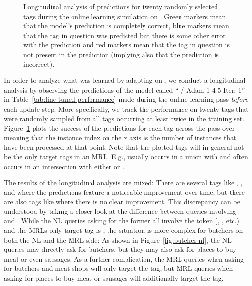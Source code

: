 \begin{figure}[h]
  \centering
  \resizebox{\textwidth}{!}{}
  \caption[Longitudinal analysis]{Longitudinal analysis of predictions for
    twenty randomly selected tags during the online learning simulation on
    \nlmfour{}. \textcolor{mplGreen}{Green markers} mean that the model’s
    prediction is completely correct, \textcolor{mplBlue}{blue markers} mean
    that the tag in question was predicted but there is some other error with
    the prediction and \textcolor{mplRed}{red markers} mean that the tag in
    question is not present in the prediction (implying also that the prediction
    is incorrect).}
  \label{fig:online-analysis}
\end{figure}

In order to analyze what was learned by adapting on \nlmfour{}, we conduct a
longitudinal analysis by observing the predictions of the model called
\enquote{\nlmthree{} \textrightarrow{} \nlmthree{}/\nlmfour{} Adam 1-4-5 Iter:
  1} in Table~\ref{tab:fine-tuned-performance} made during the online learning
pass \emph{before} each update step. More specifically, we track the performance
on twenty tags that were randomly sampled from all tags occurring at least twice
in the \nlmfour{} training set. Figure~\ref{fig:online-analysis} plots the
success of the predictions for each tag across the pass over \nlmfour{} meaning
that the instance index on the x axis is the number of instances that have been
processed at that point. Note that the plotted tags will in general not be the
only target tags in an MRL. E.g.,  usually occurs
in a union with  and  often occurs
in an intersection with either  or
.

The results of the longitudinal analysis are mixed: There are several tags like
, ,  and
 where the predictions feature a noticeable improvement
over time, but there are also tags like  where there is no
clear improvement. This discrepancy can be understood by taking a closer look at
the difference between queries involving  and .
While the NL queries asking for the former all involve the token 
(, , etc.) and the MRLs only
target tag is , the situation is more complex for butchers
on both the NL and the MRL side: As shown in Figure~\ref{fig:butcher-nl}, the NL
queries may directly ask for butchers, but they may also ask for places to buy
meat or even sausages. As a further complication, the MRL queries when asking
for butchers and meat shops will only target the  tag, but
MRL queries when asking for places to buy meat or sausages will additionally
target the  tag.

